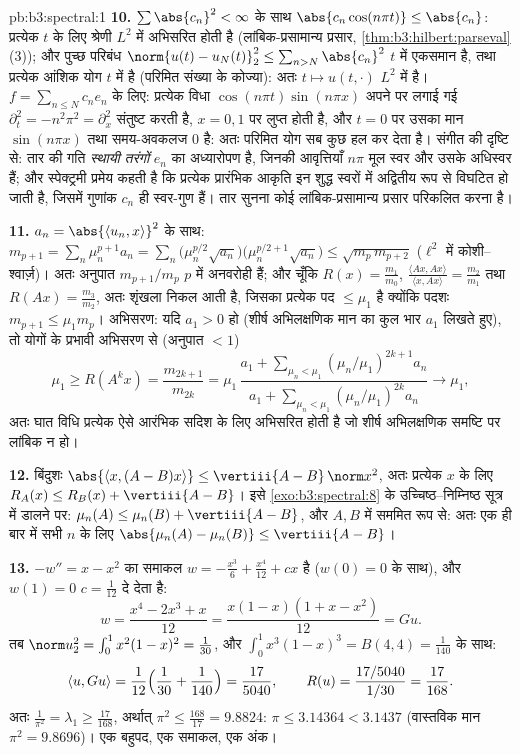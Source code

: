 \begin{solution}{pb:b3:spectral:1}
\textbf{10.} $\sum\abs{c_n}^2 < \infty$ के साथ $\abs{c_n\cos(n\pi t)} \leq \abs{c_n}$: प्रत्येक $t$ के लिए श्रेणी $L^2$
में अभिसरित होती है (लांबिक-प्रसामान्य प्रसार, \cref{thm:b3:hilbert:parseval}(3)); और पुच्छ
परिबंध $\norm{u(t) - u_N(t)}_2^2 \leq \sum_{n>N}\abs{c_n}^2$ $t$ में एकसमान है, तथा प्रत्येक आंशिक योग $t$ में
 है (परिमित संख्या के कोज्या): अतः $t \mapsto u(t,\cdot)$ $L^2$ में  है। $f = \sum_{n\leq N}c_ne_n$
के लिए: प्रत्येक विधा $\cos(n\pi t)\sin(n\pi x)$ अपने पर लगाई गई $\partial_t^2 =
-n^2\pi^2 = \partial_x^2$ संतुष्ट करती है,
$x = 0,
1$ पर लुप्त होती है, और $t =
0$ पर उसका मान $\sin(n\pi x)$ तथा समय-अवकलज
$0$ है: अतः परिमित योग सब कुछ हल कर देता है। संगीत की दृष्टि से:
तार की गति \emph{स्थायी तरंगों} $e_n$ का अध्यारोपण है, जिनकी आवृत्तियाँ
$n\pi$ मूल स्वर और उसके अधिस्वर हैं; और स्पेक्ट्रमी प्रमेय कहती है
कि प्रत्येक प्रारंभिक आकृति इन शुद्ध स्वरों में अद्वितीय रूप से विघटित
हो जाती है, जिसमें गुणांक $c_n$ ही स्वर-गुण हैं। तार सुनना कोई
लांबिक-प्रसामान्य प्रसार परिकलित करना है।

\textbf{11.} $a_n = \abs{\langle u_n, x\rangle}^2$ के साथ: $m_{p+1} = \sum_n\mu_n^{p+1}a_n = \sum_n\bigl(\mu_n^{p/2}
\sqrt{a_n}\bigr)\bigl(\mu_n^{p/2+1}\sqrt{a_n}\bigr) \leq
\sqrt{m_p\,m_{p+2}}$ ($\ell^2$ में कोशी--श्वार्ज़)। अतः
अनुपात $m_{p+1}/m_p$ $p$ में अनवरोही हैं; और चूँकि $R(x) = \frac{m_1}{m_0}$, $\frac{\langle Ax, Ax\rangle}
{\langle x, Ax\rangle} = \frac{m_2}{m_1}$ तथा $R(Ax) =
\frac{m_3}{m_2}$,
अतः शृंखला निकल आती है, जिसका प्रत्येक पद $\leq \mu_1$ है क्योंकि पदशः
$m_{p+1} \leq \mu_1m_p$। अभिसरण: यदि $a_1 > 0$ हो (शीर्ष अभिलक्षणिक मान का कुल भार $a_1$
लिखते हुए), तो योगों के प्रभावी अभिसरण से (अनुपात $< 1$)
\[
\mu_1 \geq R(A^kx) = \frac{m_{2k+1}}{m_{2k}} =
\mu_1\,\frac{a_1 + \sum_{\mu_n<\mu_1}(\mu_n/\mu_1)^{2k+1}
a_n}{a_1 + \sum_{\mu_n<\mu_1}(\mu_n/\mu_1)^{2k}a_n}
\longrightarrow \mu_1,
\]
अतः घात विधि प्रत्येक ऐसे आरंभिक सदिश के लिए अभिसरित होती है जो शीर्ष
अभिलक्षणिक समष्टि पर लांबिक न हो।

\textbf{12.} बिंदुशः $\abs{\langle x, (A - B)x\rangle}
\leq \vertiii{A - B}\,\norm x^2$, अतः प्रत्येक $x$ के लिए $R_A(x) \leq R_B(x) +
\vertiii{A - B}$। इसे
\cref{exo:b3:spectral:8} के उच्चिष्ठ--निम्निष्ठ सूत्र में डालने पर: $\mu_n(A)
\leq \mu_n(B) + \vertiii{A - B}$, और $A,
B$ में
सममित रूप से: अतः एक ही बार में सभी $n$ के लिए $\abs{\mu_n(A) - \mu_n(B)} \leq \vertiii{A - B}$।

\textbf{13.} $-w'' = x - x^2$ का समाकल $w = -\frac{x^3}6
+ \frac{x^4}{12} + cx$ है ($w(0) = 0$ के साथ), और $w(1) = 0$ $c = \frac1{12}$
दे देता है:
\[
w = \frac{x^4 - 2x^3 + x}{12} = \frac{x(1-x)(1 + x -
x^2)}{12} = Gu .
\]
तब $\norm u_2^2 = \int_0^1x^2(1-x)^2 = \frac1{30}$, और $\int_0^1x^3(1-x)^3 = B(4,4) = \frac1{140}$ के साथ:
\[
\langle u, Gu\rangle = \frac1{12}\Bigl(\frac1{30} +
\frac1{140}\Bigr) = \frac{17}{5040},
\qquad
R(u) = \frac{17/5040}{1/30} = \frac{17}{168} .
\]
अतः $\frac1{\pi^2} = \lambda_1 \geq \frac{17}{168}$, अर्थात् $\pi^2 \leq \frac{168}{17} = 9.8824$: $\pi \leq 3.14364 <
3.1437$ (वास्तविक मान $\pi^2 = 9.8696$)। एक बहुपद, एक
समाकल, एक अंक।


\end{solution}
